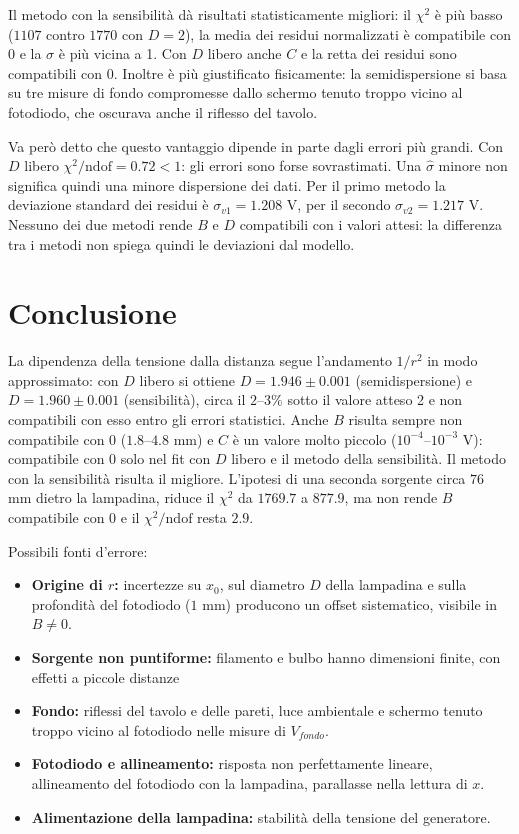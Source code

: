 \documentclass[10pt,twocolumn]{article}
\begin{document}
\noindent Il metodo con la sensibilità dà risultati statisticamente migliori: il $\chi^2$ è più basso
($1107$ contro $1770$ con $D=2$), la media dei residui normalizzati è compatibile con 0 e la
$\sigma$ è più vicina a 1. Con $D$ libero anche $C$ e la retta dei residui sono compatibili con 0.
Inoltre è più giustificato fisicamente: la semidispersione si basa su tre misure di fondo
compromesse dallo schermo tenuto troppo vicino al fotodiodo, che oscurava anche il riflesso del tavolo.

\noindent Va però detto che questo vantaggio dipende in parte dagli errori più grandi. Con $D$ libero
$\chi^2/\mathrm{ndof}=0.72<1$: gli errori sono forse sovrastimati. Una $\hat\sigma$
minore non significa quindi una minore dispersione dei dati. Per il primo metodo la deviazione
standard dei residui è $\sigma_{v1}= 1.208$ V, per il secondo $\sigma_{v2} = 1.217$ V.
Nessuno dei due metodi rende $B$ e $D$ compatibili con i valori attesi: la differenza tra i
metodi non spiega quindi le deviazioni dal modello.

\section{Conclusione}
La dipendenza della tensione dalla distanza segue l'andamento $1/r^2$ in modo approssimato: con $D$
libero si ottiene $D=1.946\pm0.001$ (semidispersione) e $D=1.960\pm0.001$ (sensibilità), circa il
$2$--$3\%$ sotto il valore atteso 2 e non compatibili con esso entro gli errori statistici.
Anche $B$ risulta sempre non compatibile con 0 ($1.8$--$4.8$ mm) e $C$ è un valore molto piccolo ($10^{-4}$--$10^{-3}$ V):
 compatibile con 0 solo nel fit con $D$ libero e il metodo della sensibilità. Il metodo con la
sensibilità risulta il migliore. L'ipotesi di una seconda sorgente circa $76$ mm dietro la lampadina,
 riduce il $\chi^2$ da $1769.7$ a $877.9$, ma
non rende $B$ compatibile con 0 e il $\chi^2/\mathrm{ndof}$ resta $2.9$.

\noindent Possibili fonti d'errore:
\begin{itemize}
    \item \textbf{Origine di $r$:} incertezze su $x_0$, sul diametro $D$ della lampadina e sulla
    profondità del fotodiodo ($1$ mm) producono un offset sistematico, visibile in $B\neq0$.
    \item \textbf{Sorgente non puntiforme:} filamento e bulbo hanno dimensioni finite, con effetti
    a piccole distanze
    \item \textbf{Fondo:} riflessi del tavolo e delle pareti, luce ambientale e schermo tenuto
    troppo vicino al fotodiodo nelle misure di $V_{fondo}$.
    \item \textbf{Fotodiodo e allineamento:} risposta non perfettamente lineare, allineamento del
    fotodiodo con la lampadina, parallasse nella lettura di $x$.
    \item \textbf{Alimentazione della lampadina:} stabilità della tensione del generatore.
\end{itemize}
\end{document}
